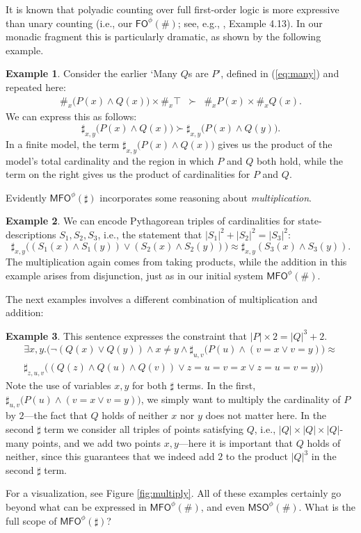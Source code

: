 \documentclass[12pt,oneside,reqno]{amsart}
\theoremstyle{definition}
\newtheorem{example}{Example}
\begin{document}
It is known that polyadic counting over full first-order logic is more expressive than unary counting (i.e., our $\mathsf{FO}^\phi(\#)$; see, e.g., \citealt{Otto}, Example 4.13). In our monadic fragment this is particularly dramatic, as shown by the following example. 
\begin{example} Consider the earlier `Many $Q$s are $P$', defined in (\ref{eq:many}) and repeated here: \begin{eqnarray*}
\#_x\big(P(x) \wedge Q(x)\big) \times \#_x \top & \succ & \#_x P(x) \times \#_x Q(x).
\end{eqnarray*} We can express this as follows: $$ \sharp_{x,y} \big(P(x) \wedge Q(x)\big) \succ \sharp_{x,y} \big(P(x) \wedge Q(y)\big).  $$ In a finite model, the term $\sharp_{x,y} \big(P(x) \wedge Q(x)\big)$ gives us the product of the model's total cardinality and the region in which $P$ and $Q$ both hold, while the term on the right gives us the product of cardinalities for $P$ and $Q$. \end{example}
 Evidently $\mathsf{MFO}^{\phi}(\sharp)$ incorporates some reasoning about \emph{multiplication}. 
\begin{example} We can encode Pythagorean triples of cardinalities for state-descriptions $S_1,S_2,S_3$, i.e., the statement that $|S_1|^2 + |S_2|^2 = |S_3|^2$:
$$ \sharp_{x,y}\big((S_1(x) \wedge S_1(y)) \vee (S_2(x) \wedge S_2(y))\big) \approx \sharp_{x,y}(S_3(x) \wedge S_3(y)). $$ The multiplication again comes from taking products, while the addition in this example arises from disjunction, just as in our initial system $\mathsf{MFO}^\phi(\#)$. \end{example} 
The next examples involves a different combination of multiplication and addition:
\begin{example} \label{ex:complicatedone} This sentence expresses the constraint that $|P|\times 2 = |Q|^3 + 2$. 
\begin{gather*}
     \exists x,y.\Big(\neg (Q(x) \vee Q(y)) \wedge x \neq y \wedge \sharp_{u,v}\big( P(u) \wedge (v=x \vee v=y)  \big)\approx \\ \sharp_{z,u,v} \big((Q(z) \wedge Q(u) \wedge Q(v)) \vee z=u=v=x \vee z=u=v=y   \big)   \Big)
\end{gather*} Note the use of variables $x,y$ for both $\sharp$ terms. In the first, $\sharp_{u,v}\big( P(u) \wedge (v=x \vee v=y)  \big)$, we simply want to multiply the cardinality of $P$ by $2$---the fact that $Q$ holds of neither $x$ nor $y$ does not matter here. In the second $\sharp$ term we consider all triples of points satisfying $Q$, i.e., $|Q|\times|Q|\times|Q|$-many points, and we add two points $x,y$---here it is important that $Q$ holds of neither, since this guarantees that we indeed add $2$ to the product $|Q|^3$ in the second $\sharp$ term. 
\end{example}
For a visualization, see Figure \ref{fig:multiply}. 
All of these examples certainly go beyond what can be expressed in $\mathsf{MFO}^\phi(\#)$, and even $\mathsf{MSO}^\phi(\#)$. What is the full scope of $\mathsf{MFO}^{\phi}(\sharp)$?
\end{document}

